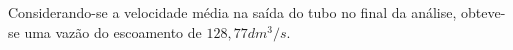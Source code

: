 \begin{figure}[!htbp]
\label{fig:turbina_mono_vel}
\end{figure}

Considerando-se a velocidade média na saída do tubo no final da análise, obteve-se uma vazão do escoamento de $128,77dm^3/s$.

